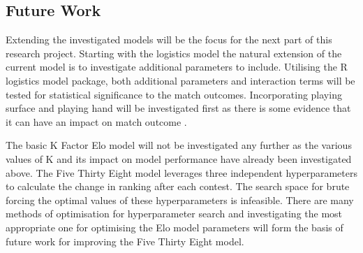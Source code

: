 \documentclass[12pt,a4paper]{article}
\begin{document}
\subsection{Future Work}
Extending the investigated models will be the focus for the next part of this research
project. Starting with the logistics model the natural extension of the current model
is to investigate additional parameters to include. Utilising the R logistics model
package, both additional parameters and interaction terms will be tested for statistical
significance to the match outcomes. Incorporating playing surface and playing hand will
be investigated first as there is some evidence that it can have an impact on match
outcome \cite{loffing_left-handedness_2012}.

The basic K Factor Elo model will not be investigated any further as the various values
of K and its impact on model performance have already been investigated above. The Five
Thirty Eight model leverages three independent hyperparameters to calculate the change
in ranking after each contest. The search space for brute forcing the optimal values of
these hyperparameters is infeasible. There are many methods of optimisation for
hyperparameter search \cite{claesen_hyperparameter_2015} and investigating the
most appropriate one for optimising the Elo model parameters will form the basis of
future work for improving the Five Thirty Eight model.
\end{document}

